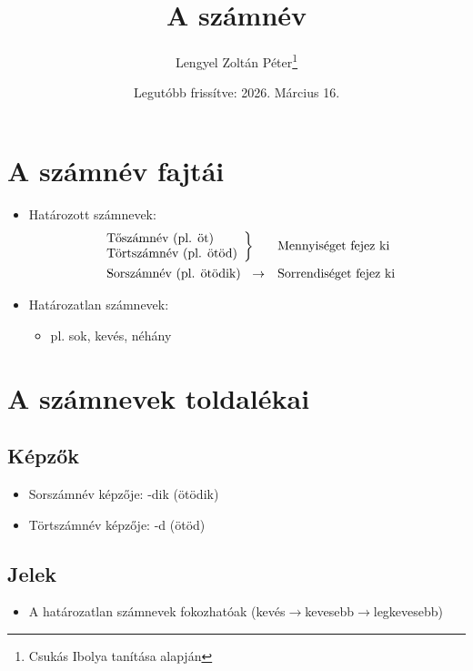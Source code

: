 \documentclass{article}
\title{A számnév}
\author{Lengyel Zoltán Péter\thanks{Csukás Ibolya tanítása alapján}}
\date{Legutóbb frissítve: 2026. Március 16.}
\begin{document}
\maketitle
\tableofcontents
\newpage

\section{A számnév fajtái}
\begin{itemize}
    \item Határozott számnevek:
    \[
\begin{array}{l l}
\left.
\begin{array}{l}
\text{Tőszámnév (pl. öt)} \\
\text{Törtszámnév (pl. ötöd)}
\end{array}
\right\}
& \text{Mennyiséget fejez ki}
\\[10pt]
\left.
\begin{array}{l}
\text{Sorszámnév (pl. ötödik)}\\
\end{array}
\right.\rightarrow
& \text{Sorrendiséget fejez ki}
\end{array}
\]
\item Határozatlan számnevek:
\begin{itemize}
    \item pl. sok, kevés, néhány
\end{itemize}
\end{itemize}


\section{A számnevek toldalékai}
\subsection{Képzők}
\begin{itemize}
    \item Sorszámnév képzője: -dik (ötödik)
    \item Törtszámnév képzője: -d (ötöd)
\end{itemize}
\subsection{Jelek}
\begin{itemize}
    \item A határozatlan számnevek fokozhatóak (kevés$\rightarrow$kevesebb$\rightarrow$legkevesebb)
\end{itemize}
\end{document}
